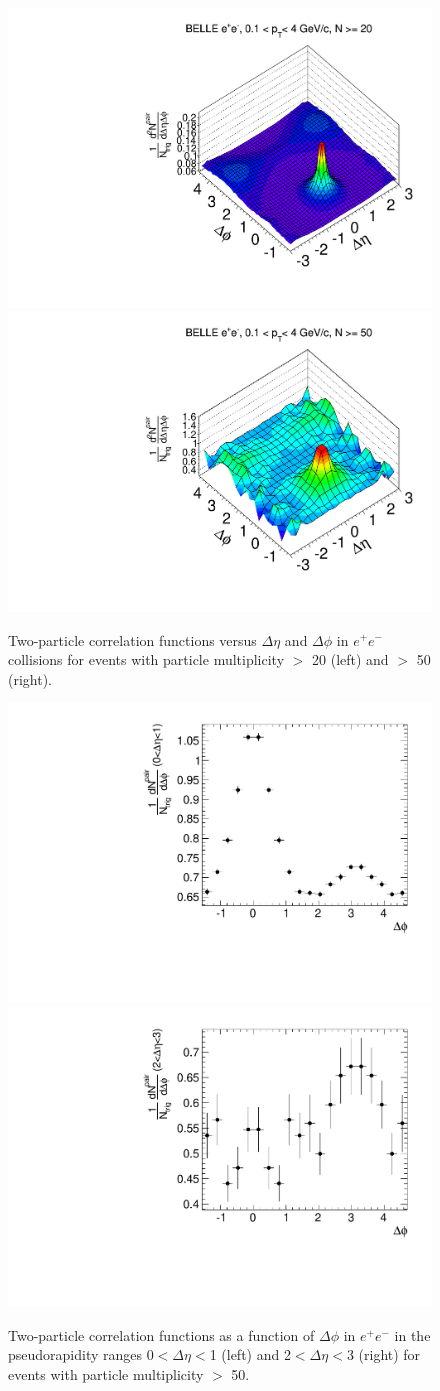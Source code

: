 \begin{figure}[!htb]
\begin{center}
\includegraphics[width=.45\textwidth]{figures/canvasRidgeBelleMult20CutHigh0.pdf}
\includegraphics[width=.45\textwidth]{figures/canvasRidgeBelleMult50CutHigh0.pdf}
\caption{Two-particle correlation functions versus $\Delta\eta$ and $\Delta\phi$ in $e^{+}e^{-}$ collisions for events with particle multiplicity $>$ 20 (left) and  $>$ 50 (right).}
\label{fig:ridgeBelle} 
\end{center}
\end{figure}

\begin{figure}[!htb]
\begin{center}
\includegraphics[width=.45\textwidth]{figures/canvasProjection_isBelle1_mult50_eta01.pdf}
\includegraphics[width=.45\textwidth]{figures/canvasProjection_isBelle1_mult50_eta23.pdf}
\caption{Two-particle correlation functions as a function of  $\Delta\phi$ in $e^{+}e^{-}$ in the pseudorapidity ranges 0$<\Delta \eta<$1 (left) and 2$<\Delta \eta<$3 (right) for events with particle multiplicity $>$ 50.}
\label{fig:ProjectionMult50} 
\end{center}
\end{figure}

